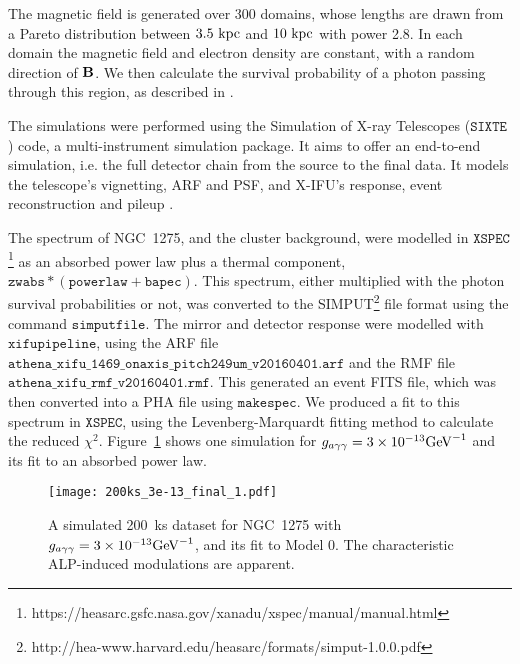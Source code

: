 \documentclass[fleqn,usenatbib,useAMS]{mnras}
\begin{document}
The magnetic field is generated over 300 domains, whose lengths are drawn from a Pareto distribution between $3.5~\rm{kpc}$ and $10~\rm{kpc}$ with power 2.8. In each domain the magnetic field and electron density are constant, with a random direction of ${\bf B}$. We then
calculate the survival probability of a photon passing through this region, as described in \cite{1312.3947}.

The simulations were performed using the Simulation of X-ray Telescopes ($\mathtt{SIXTE}$) code, a multi-instrument simulation package. It aims to offer an end-to-end simulation, i.e. the full detector chain from the source to the final data. It models the telescope's vignetting, ARF and PSF, and X-IFU's response, event reconstruction and pileup \cite{2014SPIE.9144E..5XW}.

The spectrum of NGC~1275, and the cluster background, were modelled in $\mathtt{XSPEC}$\footnote{https://heasarc.gsfc.nasa.gov/xanadu/xspec/manual/manual.html} as an absorbed power law plus a thermal component, $\mathtt{zwabs*(powerlaw + bapec)}$. This spectrum, either multiplied with the photon survival probabilities or not, was converted to the SIMPUT\footnote{http://hea-www.harvard.edu/heasarc/formats/simput-1.0.0.pdf} file format using the command $\mathtt{simputfile}$. The mirror and detector response were modelled with $\mathtt{xifupipeline}$, using the ARF file $\mathtt{athena\_xifu\_1469\_onaxis\_pitch249um\_v20160401.arf}$ and the RMF file $\mathtt{athena\_xifu\_rmf\_v20160401.rmf}$. This generated an event FITS file, which was then converted into a PHA file using $\mathtt{makespec}$. We produced a fit to this spectrum in $\mathtt{XSPEC}$, using the Levenberg-Marquardt fitting method to calculate the reduced $\chi^2$. Figure~\ref{spectrum} shows one simulation for ${g_{a \gamma \gamma} = 3 \times 10^{-13} {\rm GeV}^{-1}}$ and its fit to an absorbed power law.

\begin{figure}
\texttt{[image: 200ks\_3e-13\_final\_1.pdf]}
\caption{A simulated 200~ks dataset for NGC~1275 with ${g_{a \gamma \gamma} = 3 \times 10^{-13} \rm{GeV}^{-1}}$, and its fit to Model 0. The characteristic ALP-induced modulations are apparent.}
\label{spectrum}
\end{figure}
\end{document}
